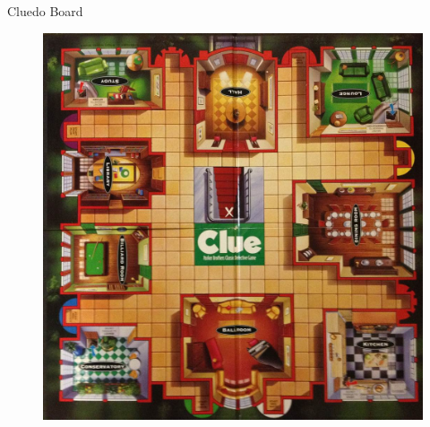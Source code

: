 
\begin{frame}{Cluedo Board}
	\begin{figure}[h]
		\centering
		\includegraphics[height=0.7\textheight]{images/clue-board.jpg}
		\label{fig:game}
	\end{figure}
\end{frame}


